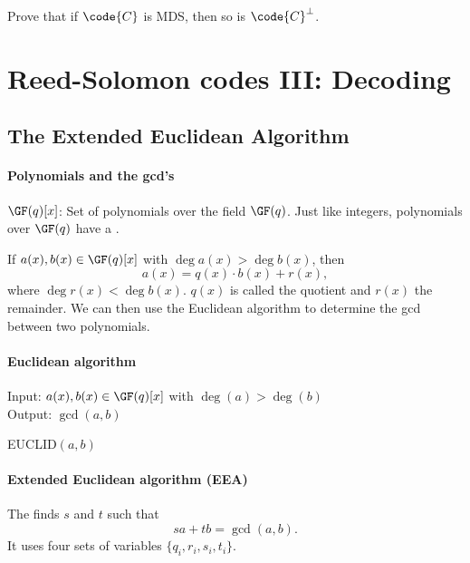 \documentclass[a4paper, 11pt, openany]{book}
\begin{document}
\begin{exercise} \label{q:MDS}
Prove that if $\code{C}$ is MDS, then so is $\code{C}^\perp$.
\end{exercise}


\section{Reed-Solomon codes III: Decoding}
\label{sec:28}




\subsection{The Extended Euclidean Algorithm}





\paragraph{Polynomials and the gcd's}
$\GF(q)[x]$: Set of polynomials over the field $\GF(q)$. Just like integers, polynomials over $\GF(q)$ have a .

If $a(x), b(x) \in \GF(q)[x]$ with $\deg a(x) > \deg b(x)$, then
\[
	a(x) = q(x) \cdot b(x) + r(x),
\]
where $\deg r(x) < \deg b(x)$. $q(x)$ is called the quotient and $r(x)$ the remainder. We can then use the Euclidean algorithm to determine the gcd between two polynomials.



\paragraph{Euclidean algorithm}
Input: $a(x), b(x) \in \GF(q)[x]$ with $\deg(a) > \deg(b)$\\
Output: $\gcd(a,b)$

\begin{algorithm}[H]
\caption{EUCLID$(a,b)$}
\begin{algorithmic}[1]
		\State{}
	\Else{}
		\State{}
	\EndIf
\end{algorithmic}
\end{algorithm}



\paragraph{Extended Euclidean algorithm (EEA)}
The  finds $s$ and $t$ such that
\[
    sa + tb = \gcd(a,b).
\]
It uses four sets of variables $\{q_i, r_i, s_i, t_i\}$.
\end{document}
